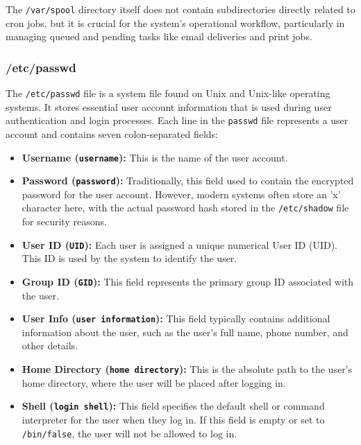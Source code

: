 \documentclass{article}
\begin{document}
                The \texttt{/var/spool} directory itself does not contain subdirectories directly related to cron jobs, but it is crucial for the system's operational workflow, particularly in managing queued and pending tasks like email deliveries and print jobs.
            \subsubsection{/etc/passwd}
                        The \texttt{/etc/passwd} file is a system file found on Unix and Unix-like operating systems. It stores essential user account information that is used during user authentication and login processes. Each line in the \texttt{passwd} file represents a user account and contains seven colon-separated fields:

                        \begin{itemize}
                            \item \textbf{Username (\texttt{username}):} This is the name of the user account.
                            \item \textbf{Password (\texttt{password}):} Traditionally, this field used to contain the encrypted password for the user account. However, modern systems often store an 'x' character here, with the actual password hash stored in the \texttt{/etc/shadow} file for security reasons.
                            \item \textbf{User ID (\texttt{UID}):} Each user is assigned a unique numerical User ID (UID). This ID is used by the system to identify the user.
                            \item \textbf{Group ID (\texttt{GID}):} This field represents the primary group ID associated with the user.
                            \item \textbf{User Info (\texttt{user information}):} This field typically contains additional information about the user, such as the user's full name, phone number, and other details.
                            \item \textbf{Home Directory (\texttt{home directory}):} This is the absolute path to the user's home directory, where the user will be placed after logging in.
                            \item \textbf{Shell (\texttt{login shell}):} This field specifies the default shell or command interpreter for the user when they log in. If this field is empty or set to \texttt{/bin/false}, the user will not be allowed to log in.
                        \end{itemize}
\end{document}
